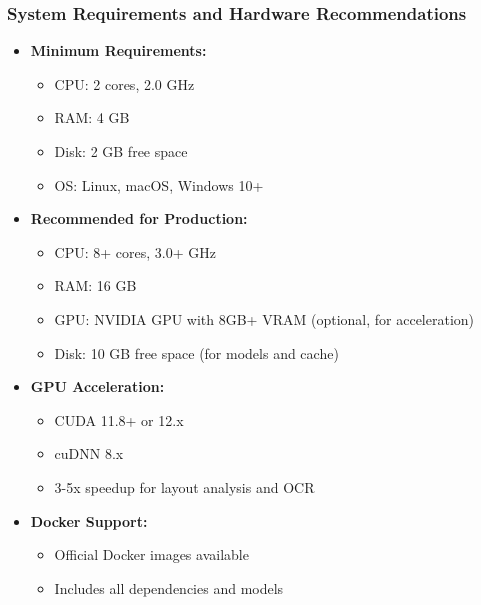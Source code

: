 \begin{frame}[fragile]\frametitle{System Requirements and Hardware Recommendations}
      \begin{itemize}
        \item \textbf{Minimum Requirements:}
        \begin{itemize}
            \item CPU: 2 cores, 2.0 GHz
            \item RAM: 4 GB
            \item Disk: 2 GB free space
            \item OS: Linux, macOS, Windows 10+
        \end{itemize}
        \item \textbf{Recommended for Production:}
        \begin{itemize}
            \item CPU: 8+ cores, 3.0+ GHz
            \item RAM: 16 GB
            \item GPU: NVIDIA GPU with 8GB+ VRAM (optional, for acceleration)
            \item Disk: 10 GB free space (for models and cache)
        \end{itemize}
        \item \textbf{GPU Acceleration:}
        \begin{itemize}
            \item CUDA 11.8+ or 12.x
            \item cuDNN 8.x
            \item 3-5x speedup for layout analysis and OCR
        \end{itemize}
        \item \textbf{Docker Support:}
        \begin{itemize}
            \item Official Docker images available
            \item Includes all dependencies and models
        \end{itemize}
      \end{itemize}
\end{frame}


